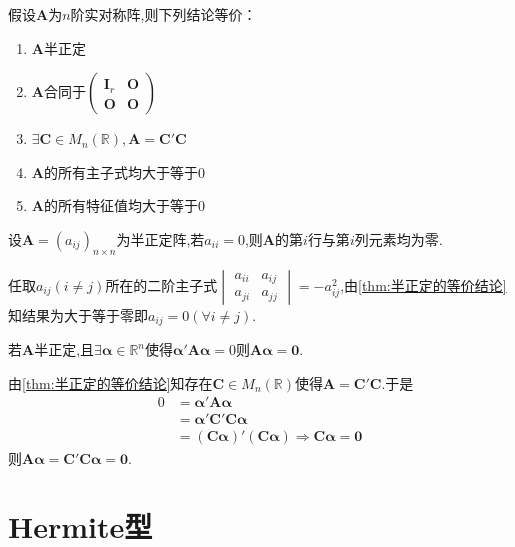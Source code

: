\begin{formal}
    \begin{theorem}[半正定的等价结论]\label{thm:半正定的等价结论}
        假设$\bm{A}$为$n$阶实对称阵,则下列结论等价：\begin{enumerate}[label={\textup{(\arabic*)}}]
            \item $\bm{A}$半正定
            \item $\bm{A}$合同于$\begin{pmatrix}
                \bm{I}_r&\bm{O}\\
                \bm{O}&\bm{O}
            \end{pmatrix}$
            \item $\exists \bm{C}\in M_n\left(\mathbb{R}\right),\bm{A}=\bm{C}'\bm{C}$
            \item $\bm{A}$的所有主子式均大于等于$0$
            \item $\bm{A}$的所有特征值均大于等于$0$
        \end{enumerate}
    \end{theorem}
\end{formal}
\begin{formal}
    \begin{proposition}[零对角元]\label{prop:零对角元}
        设$\bm{A}=\left(a_{ij}\right)_{n\times n}$为半正定阵,若$a_{ii}=0$,则$\bm{A}$的第$i$行与第$i$列元素均为零.
    \end{proposition}
    \begin{Proof}
        任取$a_{ij}\left(i\neq j\right)$所在的二阶主子式$\begin{vmatrix}
            a_{ii}&a_{ij}\\
            a_{ji}&a_{jj}
        \end{vmatrix}=-a_{ij}^2$,由\cref{thm:半正定的等价结论}知结果为大于等于零即$a_{ij}=0\left(\forall i\neq j\right).$
    \end{Proof}
\end{formal}
\begin{formal}
    \begin{proposition}[成零]\label{prop:成零}
        若$\bm{A}$半正定,且$\exists \bm{\alpha}\in\mathbb{R}^n$使得$\bm{\alpha}'\bm{A\alpha}=0$则$\bm{A\alpha}=\bm{0}.$
    \end{proposition}
    \begin{Proof}
        由\cref{thm:半正定的等价结论}知存在$\bm{C}\in M_n\left(\mathbb{R}\right)$使得$\bm{A}=\bm{C}'\bm{C}$.于是\begin{align*}
            0&=\bm{\alpha}'\bm{A\alpha}\\
            &=\bm{\alpha}'\bm{C}'\bm{C\alpha}\\
            &=\left(\bm{C\alpha}\right)'\left(\bm{C\alpha}\right)\Longrightarrow\bm{C\alpha}=\bm{0}
        \end{align*}则$\bm{A\alpha}=\bm{C}'\bm{C\alpha}=\bm{0}.$
    \end{Proof}
\end{formal}
\newpage\section{Hermite型}
